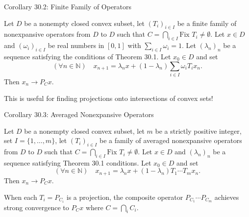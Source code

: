 \documentclass[aspectratio=169,10pt]{beamer}
\begin{document}

\begin{frame}{Corollary 30.2: Finite Family of Operators}
  \begin{corollary}
    Let $D$ be a nonempty closed convex subset, let $(T_i)_{i \in I}$ be a finite family of nonexpansive operators from $D$ to $D$ such that $C = \bigcap_{i \in I} \text{Fix } T_i \neq \emptyset$. Let $x \in D$ and $(\omega_i)_{i \in I}$ be real numbers in $[0,1]$ with $\sum_{i \in I} \omega_i = 1$. Let $(\lambda_n)_n$ be a sequence satisfying the conditions of Theorem 30.1. Let $x_0 \in D$ and set
    \[
      (\forall n \in \mathbb{N}) \quad x_{n+1} = \lambda_n x + (1 - \lambda_n) \sum_{i \in I} \omega_i T_i x_n.
    \]
    Then $x_n \to P_C x$.
  \end{corollary}

  \vspace{0.3cm}

  This is useful for finding projections onto intersections of convex sets!
\end{frame}


\begin{frame}{Corollary 30.3: Averaged Nonexpansive Operators}
  \begin{corollary}
    Let $D$ be a nonempty closed convex subset, let $m$ be a strictly positive integer, set $I = \{1, \ldots, m\}$, let $(T_i)_{i \in I}$ be a family of averaged nonexpansive operators from $D$ to $D$ such that $C = \bigcap_{i \in I} \text{Fix } T_i \neq \emptyset$. Let $x \in D$ and $(\lambda_n)_n$ be a sequence satisfying Theorem 30.1 conditions. Let $x_0 \in D$ and set
    \[
      (\forall n \in \mathbb{N}) \quad x_{n+1} = \lambda_n x + (1 - \lambda_n) T_1 \cdots T_m x_n.
    \]
    Then $x_n \to P_C x$.
  \end{corollary}

  \vspace{0.3cm}

  \begin{example}
    When each $T_i = P_{C_i}$ is a projection, the composite operator $P_{C_1} \cdots P_{C_m}$ achieves strong convergence to $P_C x$ where $C = \bigcap_i C_i$.
  \end{example}
\end{frame}

\end{document}
